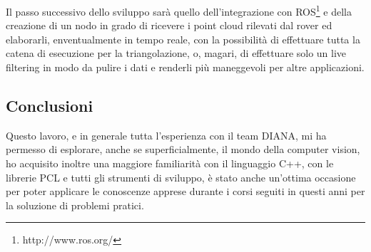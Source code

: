 \documentclass[a4paper,12pt]{article}
\begin{document}
	Il passo successivo dello sviluppo sarà quello dell'integrazione con ROS\footnote{http://www.ros.org/} e della creazione di
	un nodo in grado di ricevere i point cloud rilevati dal rover ed elaborarli, enventualmente in tempo reale, con la
	possibilità di effettuare tutta la catena di esecuzione per la triangolazione, o, magari, di effettuare solo un live
	filtering in modo da pulire i dati e renderli più maneggevoli per altre applicazioni.
	\subsection{Conclusioni}
	Questo lavoro, e in generale tutta l'esperienza con il team DIANA, mi ha permesso di esplorare, anche se superficialmente, 
	il mondo della computer vision, ho acquisito inoltre una maggiore familiarità con il linguaggio C++, con le librerie 
	PCL e tutti gli strumenti di sviluppo, è stato anche un'ottima occasione per poter applicare le conoscenze apprese durante 
	i corsi seguiti in questi anni per la soluzione di problemi pratici.
	   
\end{document}
